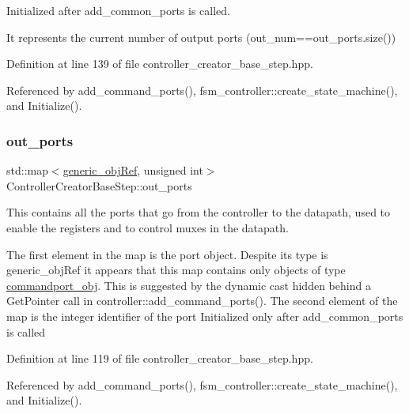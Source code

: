 Initialized after add\+\_\+common\+\_\+ports is called. 

It represents the current number of output ports (out\+\_\+num==out\+\_\+ports.\+size()) 

Definition at line 139 of file controller\+\_\+creator\+\_\+base\+\_\+step.\+hpp.



Referenced by add\+\_\+command\+\_\+ports(), fsm\+\_\+controller\+::create\+\_\+state\+\_\+machine(), and Initialize().

\mbox{\label{classControllerCreatorBaseStep_a2efc96be086bbbf888e66a80c629c85c}} 
\subsubsection{\texorpdfstring{out\+\_\+ports}{out\_ports}}
{\footnotesize\ttfamily std\+::map$<$\hyperlink{generic__obj_8hpp_acb533b2ef8e0fe72e09a04d20904ca81}{generic\+\_\+obj\+Ref}, unsigned int$>$ Controller\+Creator\+Base\+Step\+::out\+\_\+ports\hspace{0.3cm}{\ttfamily [protected]}}



This contains all the ports that go from the controller to the datapath, used to enable the registers and to control muxes in the datapath. 

The first element in the map is the port object. Despite its type is generic\+\_\+obj\+Ref it appears that this map contains only objects of type \hyperlink{classcommandport__obj}{commandport\+\_\+obj}. This is suggested by the dynamic cast hidden behind a Get\+Pointer call in controller\+::add\+\_\+command\+\_\+ports(). The second element of the map is the integer identifier of the port Initialized only after add\+\_\+common\+\_\+ports is called 

Definition at line 119 of file controller\+\_\+creator\+\_\+base\+\_\+step.\+hpp.



Referenced by add\+\_\+command\+\_\+ports(), fsm\+\_\+controller\+::create\+\_\+state\+\_\+machine(), and Initialize().

\mbox{\label{classControllerCreatorBaseStep_a734af585945c1206eda3c2ac884f9f45}} 
